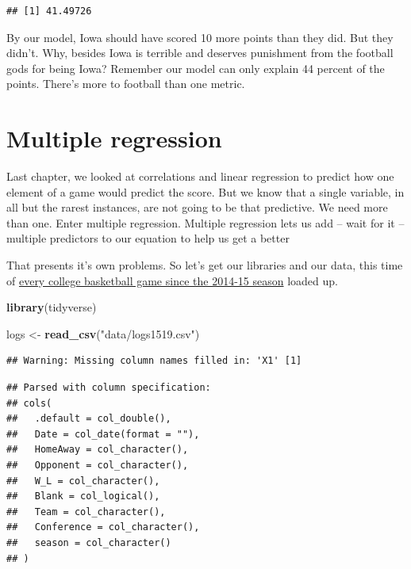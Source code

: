 \documentclass[]{book}
\newenvironment{Shaded}{\begin{snugshade}}{\end{snugshade}}
\newcommand{\KeywordTok}[1]{\textcolor[rgb]{0.13,0.29,0.53}{\textbf{#1}}}
\newcommand{\NormalTok}[1]{#1}
\newcommand{\StringTok}[1]{\textcolor[rgb]{0.31,0.60,0.02}{#1}}
\begin{document}
\begin{verbatim}
## [1] 41.49726
\end{verbatim}

By our model, Iowa should have scored 10 more points than they did. But they didn't. Why, besides Iowa is terrible and deserves punishment from the football gods for being Iowa? Remember our model can only explain 44 percent of the points. There's more to football than one metric.

\hypertarget{multiple-regression}{%
\chapter{Multiple regression}\label{multiple-regression}}

Last chapter, we looked at correlations and linear regression to predict how one element of a game would predict the score. But we know that a single variable, in all but the rarest instances, are not going to be that predictive. We need more than one. Enter multiple regression. Multiple regression lets us add -- wait for it -- multiple predictors to our equation to help us get a better

That presents it's own problems. So let's get our libraries and our data, this time of \href{https://unl.box.com/s/u9407jj007fxtnu1vbkybdawaqg6j3fw}{every college basketball game since the 2014-15 season} loaded up.

\begin{Shaded}
\begin{Highlighting}[]
\KeywordTok{library}\NormalTok{(tidyverse)}
\end{Highlighting}
\end{Shaded}

\begin{Shaded}
\begin{Highlighting}[]
\NormalTok{logs <-}\StringTok{ }\KeywordTok{read_csv}\NormalTok{(}\StringTok{"data/logs1519.csv"}\NormalTok{)}
\end{Highlighting}
\end{Shaded}

\begin{verbatim}
## Warning: Missing column names filled in: 'X1' [1]
\end{verbatim}

\begin{verbatim}
## Parsed with column specification:
## cols(
##   .default = col_double(),
##   Date = col_date(format = ""),
##   HomeAway = col_character(),
##   Opponent = col_character(),
##   W_L = col_character(),
##   Blank = col_logical(),
##   Team = col_character(),
##   Conference = col_character(),
##   season = col_character()
## )
\end{verbatim}
\end{document}

